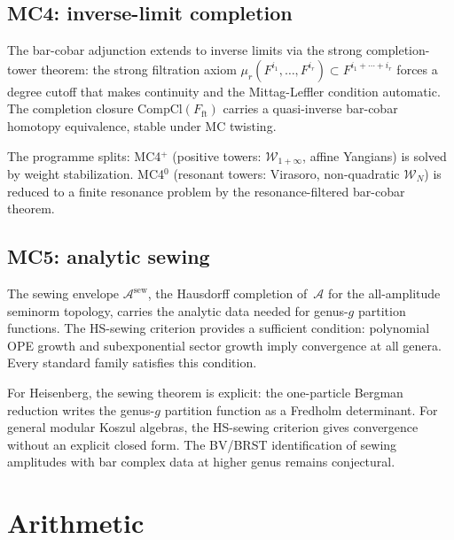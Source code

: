 \documentclass[11pt,reqno]{amsart}
\theoremstyle{definition}
\theoremstyle{remark}
\newcommand{\cA}{\mathcal{A}}
\numberwithin{equation}{section}
\newcommand{\cW}{\mathcal{W}}
\begin{document}
\subsection{MC4: inverse-limit completion}
\label{ssec:mc4}

The bar-cobar adjunction extends to inverse limits via the
strong completion-tower theorem: the strong filtration axiom
$\mu_r(F^{i_1}, \ldots, F^{i_r})
\subset F^{i_1 + \cdots + i_r}$
forces a degree cutoff that makes continuity and the
Mittag-Leffler condition automatic. The completion closure
$\mathrm{CompCl}(F_{\mathrm{ft}})$ carries a quasi-inverse
bar-cobar homotopy equivalence, stable under MC twisting.

The programme splits: MC4$^+$ (positive towers:
$\cW_{1+\infty}$, affine Yangians) is solved by weight
stabilization. MC4$^0$ (resonant towers: Virasoro,
non-quadratic $\cW_N$) is reduced to a finite resonance
problem by the resonance-filtered bar-cobar theorem.

\subsection{MC5: analytic sewing}
\label{ssec:mc5}

The sewing envelope $\cA^{\mathrm{sew}}$, the Hausdorff
completion of~$\cA$ for the all-amplitude seminorm
topology, carries the analytic data needed for genus-$g$
partition functions. The HS-sewing criterion provides a
sufficient condition: polynomial OPE growth and
subexponential sector growth imply convergence at all
genera. Every standard family satisfies this condition.

For Heisenberg, the sewing theorem is explicit: the
one-particle Bergman reduction writes the genus-$g$
partition function as a Fredholm determinant. For general
modular Koszul algebras, the HS-sewing criterion gives
convergence without an explicit closed form. The BV/BRST
identification of sewing amplitudes with bar complex
data at higher genus remains conjectural.


\section{Arithmetic}
\label{sec:arithmetic}
\end{document}
